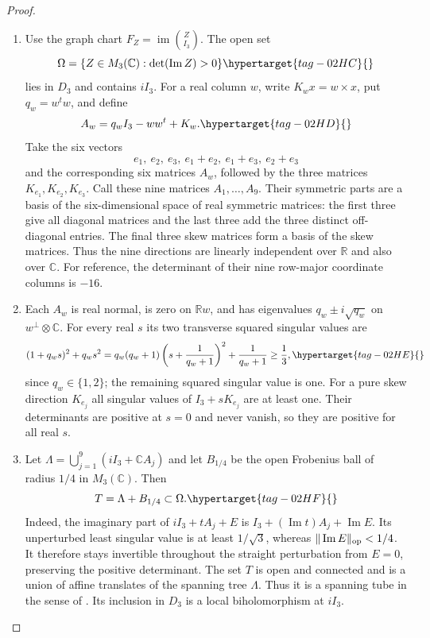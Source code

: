 \documentclass[11pt,a4paper]{article}
\numberwithin{equation}{section}
\theoremstyle{definition}
\begin{document}
\begin{proof}
\begin{enumerate}[label=\arabic*.]
\item Use the graph chart $F_Z=\operatorname{im}\binom Z{I_3}$.
The open set
\begin{equation}
 \Omega=\{Z\in M_3(\mathbb C):\det(\operatorname{Im}Z)>0\}
 \hypertarget{tag-02HC}{}\label{maps:eq:F.O1}
\end{equation}
lies in $D_3$ and contains $iI_3$.  For a real column $w$, write
$K_w x=w\times x$, put $q_w=w^tw$, and define
\begin{equation}
 A_w=q_wI_3-ww^t+K_w.
 \hypertarget{tag-02HD}{}\label{maps:eq:F.O2}
\end{equation}
Take the six vectors
\[
 e_1,\ e_2,\ e_3,\ e_1+e_2,\ e_1+e_3,\ e_2+e_3
\]
and the corresponding six matrices $A_w$, followed by the three
matrices $K_{e_1},K_{e_2},K_{e_3}$.  Call these nine matrices
$A_1,\ldots,A_9$.  Their symmetric parts are a basis of the
six-dimensional space of real symmetric matrices: the first three
give all diagonal matrices and the last three add the three distinct
off-diagonal entries.  The final three skew matrices form a basis
of the skew matrices.  Thus the nine directions are linearly
independent over $\mathbb R$ and also over $\mathbb C$.
For reference, the determinant of their nine row-major coordinate
columns is $-16$.

\item Each $A_w$ is real normal, is zero on $\mathbb Rw$, and has
eigenvalues $q_w\pm i\sqrt{q_w}$ on $w^\perp\otimes\mathbb C$.
For every real $s$ its two transverse squared singular values are
\begin{equation}
 (1+q_ws)^2+q_ws^2
 =q_w(q_w+1)\left(s+\frac1{q_w+1}\right)^2
       +\frac1{q_w+1}\ge\frac13,
 \hypertarget{tag-02HE}{}\label{maps:eq:F.O3}
\end{equation}
since $q_w\in\{1,2\}$; the remaining squared singular value is one.
For a pure skew direction $K_{e_j}$ all singular values of
$I_3+sK_{e_j}$ are at least one.  Their determinants are positive
at $s=0$ and never vanish, so they are positive for all real $s$.

\item Let $\Lambda=\bigcup_{j=1}^9(iI_3+\mathbb C A_j)$ and let
$B_{1/4}$ be the open Frobenius ball of radius $1/4$ in
$M_3(\mathbb C)$.  Then
\begin{equation}
 T=\Lambda+B_{1/4}\subset\Omega.
 \hypertarget{tag-02HF}{}\label{maps:eq:F.O4}
\end{equation}
Indeed, the imaginary part of $iI_3+tA_j+E$ is
$I_3+(\operatorname{Im}t)A_j+\operatorname{Im}E$.
Its unperturbed least singular value is at least $1/\sqrt3$,
whereas $\|\operatorname{Im}E\|_{\rm op}<1/4$.
It therefore stays invertible throughout the straight perturbation
from $E=0$, preserving the positive determinant.
The set $T$ is open and connected and is a union of affine
translates of the spanning tree $\Lambda$.  Thus it is a spanning tube in the sense of
\cite[Definition 2.1, p.~4]{IVVOkaOneV5}.  Its inclusion in
$D_3$ is a local biholomorphism at $iI_3$.


\end{enumerate}
\end{proof}
\end{document}

